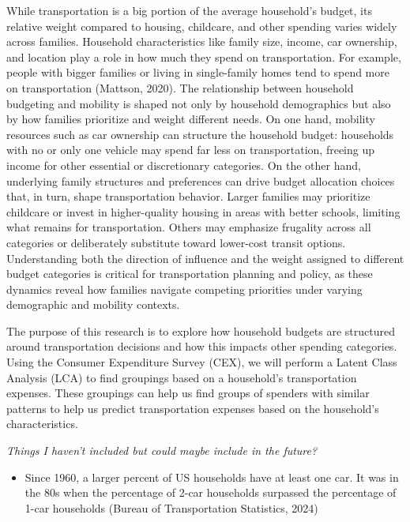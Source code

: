 \documentclass[
]{agujournal2019}
\providecommand{\tightlist}{%
  \setlength{\itemsep}{0pt}\setlength{\parskip}{0pt}}
\begin{document}
While transportation is a big portion of the average household's budget,
its relative weight compared to housing, childcare, and other spending
varies widely across families. Household characteristics like family
size, income, car ownership, and location play a role in how much they
spend on transportation. For example, people with bigger families or
living in single-family homes tend to spend more on transportation
(Mattson, 2020). The relationship between household budgeting and
mobility is shaped not only by household demographics but also by how
families prioritize and weight different needs. On one hand, mobility
resources such as car ownership can structure the household budget:
households with no or only one vehicle may spend far less on
transportation, freeing up income for other essential or discretionary
categories. On the other hand, underlying family structures and
preferences can drive budget allocation choices that, in turn, shape
transportation behavior. Larger families may prioritize childcare or
invest in higher-quality housing in areas with better schools, limiting
what remains for transportation. Others may emphasize frugality across
all categories or deliberately substitute toward lower-cost transit
options. Understanding both the direction of influence and the weight
assigned to different budget categories is critical for transportation
planning and policy, as these dynamics reveal how families navigate
competing priorities under varying demographic and mobility contexts.

The purpose of this research is to explore how household budgets are
structured around transportation decisions and how this impacts other
spending categories. Using the Consumer Expenditure Survey (CEX), we
will perform a Latent Class Analysis (LCA) to find groupings based on a
household's transportation expenses. These groupings can help us find
groups of spenders with similar patterns to help us predict
transportation expenses based on the household's characteristics.

\emph{Things I haven't included but could maybe include in the future?}

\begin{itemize}
\tightlist
\item
  Since 1960, a larger percent of US households have at least one car.
  It was in the 80s when the percentage of 2-car households surpassed
  the percentage of 1-car households (Bureau of Transportation
  Statistics, 2024)
\end{itemize}
\end{document}
